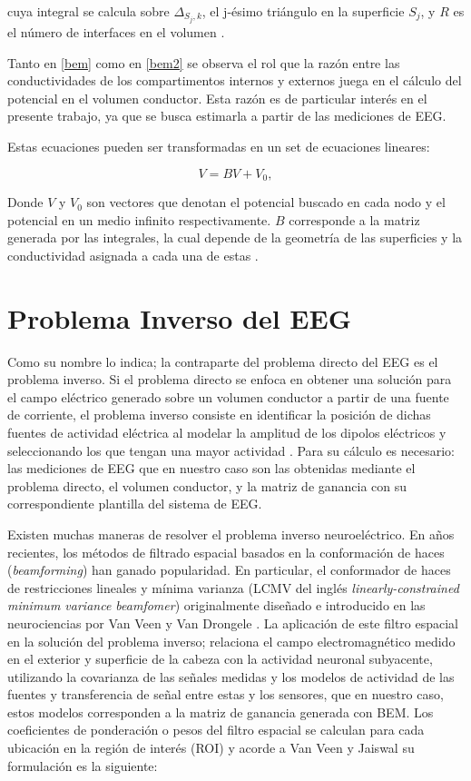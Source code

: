 cuya integral se calcula sobre $\Delta_{S_{j},k}$, el j-ésimo triángulo en la superficie $S_{j}$, y $R$ es el número de interfaces en el volumen \cite{Hallez2007}. 

Tanto en \cref{bem} como en \cref{bem2} se observa el rol que la razón entre las conductividades de los compartimentos internos y externos juega en el cálculo del potencial en el volumen conductor. Esta razón es de particular interés en el presente trabajo, ya que se busca estimarla a partir de las mediciones de EEG.

Estas ecuaciones pueden ser transformadas en un set de ecuaciones lineares:

\begin{equation}
	\label{lineal}
	V = BV + V_{0},
\end{equation}

Donde $V$ y $V_{0}$ son vectores que denotan el potencial buscado en cada nodo y el potencial en un medio infinito respectivamente. $B$ corresponde a la matriz generada por las integrales, la cual depende de la geometría de las superficies y la conductividad asignada a cada una de estas \cite{Hallez2007}.

\section{Problema Inverso del EEG}
\label{sec:intro:inverse}

Como su nombre lo indica; la contraparte del problema directo del EEG es el problema inverso. Si el problema directo se enfoca en obtener una solución para el campo eléctrico generado sobre un volumen conductor a partir de una fuente de corriente, el problema inverso consiste en identificar la posición de dichas fuentes de actividad eléctrica al modelar la amplitud de los dipolos eléctricos y seleccionando los que tengan una mayor actividad \cite{Baillet2001}. Para su cálculo es necesario: las mediciones de EEG que en nuestro caso son las obtenidas mediante el problema directo, el volumen conductor, y la matriz de ganancia con su correspondiente plantilla del sistema de EEG.

Existen muchas maneras de resolver el problema inverso neuroeléctrico. En años recientes, los métodos de filtrado espacial basados en la conformación de haces (\emph{beamforming}) han ganado popularidad. En particular, el conformador de haces de restricciones lineales y mínima varianza (LCMV del inglés \emph{linearly-constrained minimum variance beamfomer}) originalmente diseñado e introducido en las neurociencias por Van Veen y Van Drongele \cite{VanVeen1988, VanVeen1997}. La aplicación de este filtro espacial en la solución del problema inverso; relaciona el campo electromagnético medido en el exterior y superficie de la cabeza con la actividad neuronal subyacente, utilizando la covarianza de las señales medidas y los modelos de actividad de las fuentes y transferencia de señal entre estas y los sensores, que en nuestro caso, estos modelos corresponden a la matriz de ganancia generada con BEM. Los coeficientes de ponderación o pesos del filtro espacial se calculan para cada ubicación en la región de interés (ROI) y acorde a Van Veen y Jaiswal \cite{VanVeen1997,Jaiswal2020} su formulación es la siguiente:

